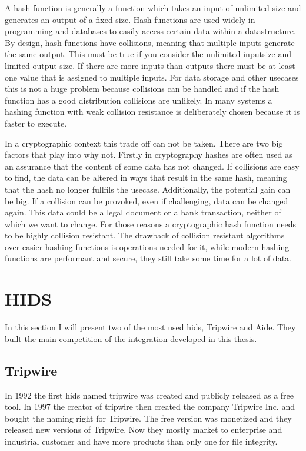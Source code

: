 \documentclass[
	a4paper,					%
	10pt,							%
	twoside,					%
	openright,				%
	notitlepage,			%
	parskip=half,			%
]{scrreprt}					%
\begin{document}
A hash function is generally a function which takes an input of unlimited size and generates an output of a fixed size. Hash functions are used widely in programming and databases to easily access certain data within a datastructure. By design, hash functions have collisions, meaning that multiple inputs generate the same output. This must be true if you consider the unlimited inputsize and limited output size. If there are more inputs than outputs there must be at least one value that is assigned to multiple inputs. For data storage and other usecases this is not a huge problem because collisions can be handled and if the hash function has a good distribution collisions are unlikely. In many systems a hashing function with weak collision resistance is deliberately chosen because it is faster to execute. \cite{hash:noncrypto, hash:slow}

In a cryptographic context this trade off can not be taken. There are two big factors that play into why not. Firstly in cryptography hashes are often used as an assurance that the content of some data has not changed. If collisions are easy to find, the data can be altered in ways that result in the same hash, meaning that the hash no longer fullfils the usecase. Additionally, the potential gain can be big. If a collision can be provoked, even if challenging, data can be changed again. This data could be a legal document or a bank transaction, neither of which we want to change. For those reasons a cryptographic hash function needs to be highly collision resistant. The drawback of collision resistant algorithms over easier hashing functions is operations needed for it, while modern hashing functions are performant and secure, they still take some time for a lot of data. \cite{crypto}


\section{HIDS}
\label{sec:hids}

In this section I will present two of the most used \gls{hids}, Tripwire and Aide. They built the main competition of the integration developed in this thesis.

\subsection{Tripwire}
\label{sec:tripwire}

In 1992 the first \gls{hids} named tripwire was created and publicly released as a free tool. In 1997 the creator of tripwire then created the company Tripwire Inc. and bought the naming right for Tripwire. The free version was monetized and they released new versions of Tripwire. \cite{Tripwire:Impl,Tripwire:company} Now they mostly market to enterprise and industrial customer and have more products than only one for file integrity. \cite{tripwire}
\end{document}
